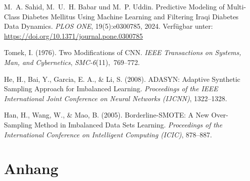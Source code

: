 \documentclass[10pt]{scrartcl}
\begin{document}
\begin{thebibliography}{}
M.~A. Sahid, M.~U.~H. Babar und M.~P. Uddin.
\newblock Predictive Modeling of Multi-Class Diabetes Mellitus Using Machine
          Learning and Filtering Iraqi Diabetes Data Dynamics.
\newblock \emph{PLOS ONE}, 19(5):e0300785, 2024.
\newblock Verfügbar unter:
\url{https://doi.org/10.1371/journal.pone.0300785}

Tomek, I. (1976). Two Modifications of CNN. \textit{IEEE Transactions on Systems, Man, and Cybernetics}, \textit{SMC-6}(11), 769--772.

He, H., Bai, Y., Garcia, E. A., \& Li, S. (2008). ADASYN: Adaptive Synthetic Sampling Approach for Imbalanced Learning. \textit{Proceedings of the IEEE International Joint Conference on Neural Networks (IJCNN)}, 1322--1328.

Han, H., Wang, W., \& Mao, B. (2005). Borderline-SMOTE: A New Over-Sampling Method in Imbalanced Data Sets Learning. \textit{Proceedings of the International Conference on Intelligent Computing (ICIC)}, 878--887.



\end{thebibliography}



\newpage
\appendix
\section{Anhang}
\end{document}

